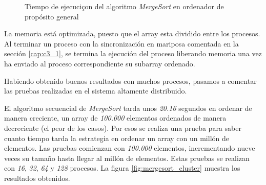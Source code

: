 		\begin{figure}[!h]
		\caption{Tiempo de ejecuciçon del algoritmo \textit{MergeSort} en ordenador de propósito general}
		\label{fig:mergesort_hist}
		\end{figure}
		
			
		
		La memoria está optimizada, puesto que el array esta dividido entre los procesos. Al terminar un proceso con la sincronización en mariposa comentada en la sección \ref{cap:c3_1}, se termina la ejecución del proceso liberando memoria una vez ha enviado al proceso correspondiente su subarray ordenado.
		
		\newpage
		
		
		Habiendo obtenido buenos resultados con muchos procesos, pasamos a comentar las pruebas realizadas en el sistema altamente distribuido.
		
		El algoritmo secuencial de \textit{MergeSort} tarda unos \textit{20.16} segundos en ordenar de manera creciente, un array de \textit{100.000} elementos ordenados de manera decreciente (el peor de los casos). Por esos se realiza una prueba para saber cuanto tiempo tarda la estrategia en ordenar un array con un millón de elementos. Las pruebas comienzan con \textit{100.000} elementos, incrementando nueve veces su tamaño hasta llegar al millón de elementos. Estas pruebas se realizan con \textit{16}, \textit{32}, \textit{64} y \textit{128} procesos. La figura \ref{fig:mergesort_cluster} muestra los resultados obtenidos. 
		
